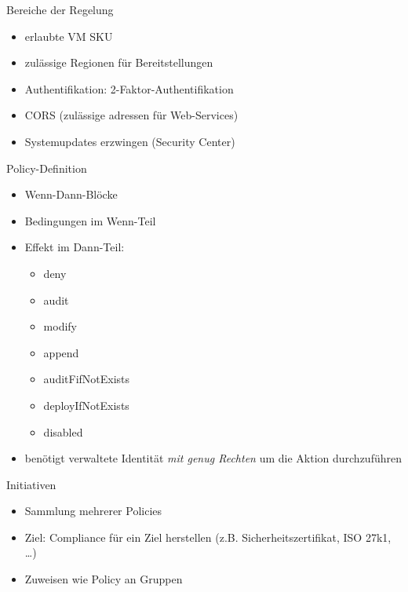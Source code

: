 \begin{flashcard}[Definition]{Bereiche der Regelung}
  \begin{itemize}
    \item erlaubte VM SKU
    \item zulässige Regionen für Bereitstellungen
    \item Authentifikation: 2-Faktor-Authentifikation
    \item CORS (zulässige adressen für Web-Services)
    \item Systemupdates erzwingen (Security Center)
  \end{itemize}
\end{flashcard}

\begin{flashcard}[Definition]{Policy-Definition}
  \begin{itemize}
    \item Wenn-Dann-Blöcke
    \item Bedingungen im Wenn-Teil
    \item Effekt im Dann-Teil:
      \begin{itemize}
        \item deny
        \item audit
        \item modify
        \item append
        \item auditFifNotExists
        \item deployIfNotExists
        \item disabled
      \end{itemize}
    \item benötigt verwaltete Identität \emph{mit genug Rechten} um die Aktion durchzuführen
  \end{itemize}
\end{flashcard}

\begin{flashcard}[Definition]{Initiativen}
  \begin{itemize}
    \item Sammlung mehrerer Policies
    \item Ziel: Compliance für ein Ziel herstellen (z.B. Sicherheitszertifikat, ISO 27k1, \ldots)
    \item Zuweisen wie Policy an Gruppen
  \end{itemize}
\end{flashcard}

